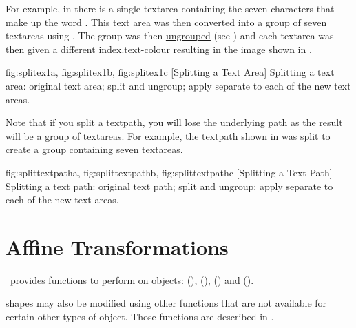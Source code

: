 For example, in  there is a single 
\gls{textarea} containing the seven characters that make up the word
.  This text area was then converted into a group of
seven \glspl*{textarea} using . The group was
then \hyperref[sec:grouping]{ungrouped} (see ) 
and each \gls{textarea} was then given a different
\gls{index.text-colour} resulting in the image
shown in .

{
  {fig:splitex1a}{}{},
  {fig:splitex1b}{}{},
  {fig:splitex1c}{}{}
} 
[Splitting a Text Area]
{Splitting a text area:
 original text area;
 split and ungroup;
 apply separate  
to each of the new text areas.}

Note that if you split a \gls*{textpath}, you will lose the
underlying path as the result will be a group of \glspl{textarea}.
For example, the \gls*{textpath} shown in
 was split to create a group
containing seven \glspl*{textarea}.

{
  {fig:splittextpatha}{}{},
  {fig:splittextpathb}{}{},
  {fig:splittextpathc}{}{}
}
[Splitting a Text Path]
{Splitting a text path:
 original text path;
 split and ungroup;
 apply
separate  to each of the new text areas.}


\chapter{Affine Transformations}\label{sec:affinetrans}

\FlowframTk\ provides functions to perform 
 on \glspl{object}:
 (), 
 (), 
 () and 
 ().

\Glspl{shape} may also be modified using other functions
that are not available for certain other types of \gls{object}. Those
functions are described in .

